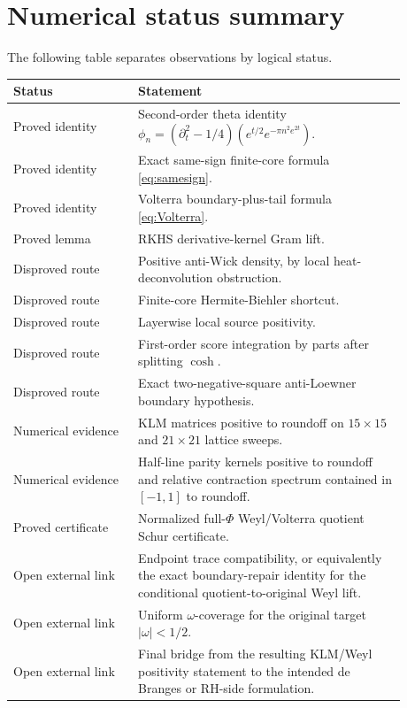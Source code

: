 \documentclass[11pt]{article}
\begin{document}
\appendix

\section{Numerical status summary}

The following table separates observations by logical status.

\begin{center}
\begin{tabular}{p{0.28\linewidth}p{0.60\linewidth}}
\toprule
Status & Statement\\
\midrule
Proved identity &
Second-order theta identity
$\phi_n=(\partial_t^2-1/4)(e^{t/2}e^{-\pi n^2e^{2t}})$.\\
Proved identity &
Exact same-sign finite-core formula \eqref{eq:samesign}.\\
Proved identity &
Volterra boundary-plus-tail formula \eqref{eq:Volterra}.\\
Proved lemma &
RKHS derivative-kernel Gram lift.\\
Disproved route &
Positive anti-Wick density, by local heat-deconvolution obstruction.\\
Disproved route &
Finite-core Hermite-Biehler shortcut.\\
Disproved route &
Layerwise local source positivity.\\
Disproved route &
First-order score integration by parts after splitting $\cosh$.\\
Disproved route &
Exact two-negative-square anti-Loewner boundary hypothesis.\\
Numerical evidence &
KLM matrices positive to roundoff on $15\times 15$ and $21\times 21$ lattice
sweeps.\\
Numerical evidence &
Half-line parity kernels positive to roundoff and relative contraction
spectrum contained in $[-1,1]$ to roundoff.\\
Proved certificate &
Normalized full-\(\Phi\) Weyl/Volterra quotient Schur certificate.\\
Open external link &
Endpoint trace compatibility, or equivalently the exact boundary-repair
identity for the conditional quotient-to-original Weyl lift.\\
Open external link &
Uniform \(\omega\)-coverage for the original target \(|\omega|<1/2\).\\
Open external link &
Final bridge from the resulting KLM/Weyl positivity statement to the intended
de Branges or RH-side formulation.\\
\bottomrule
\end{tabular}
\end{center}
\end{document}
